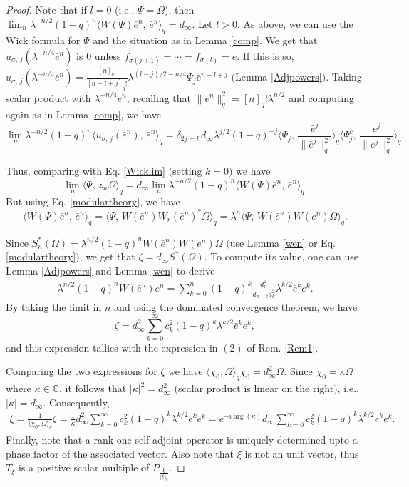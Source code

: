 \documentclass[12pt, a4paper,reqno]{amsart}
\theoremstyle{definition}
\def\C{\mathbb C}
\newcommand{\norm}[1]{\left\Vert#1\right\Vert}
\newcommand{\abs}[1]{\left\vert#1\right\vert}
\begin{document}
\begin{proof}
Note that if $l=0$ (i.e., $\Psi=\Omega$), then $\lim_n\lambda^{-n/2}(1-q)^n\langle W(\Psi) \bar{e}^n,\,\bar{e}^n\rangle_q=d_\infty$. 
Let $l>0$. As above, we can use the Wick formula for $\Psi$ and the situation as in Lemma \ref{comp}. We get that $u_{\sigma,\,j}(\lambda^{-n/4}\bar{e}^n)$ is $0$ unless $f_{\sigma(j+1)}=\cdots=f_{\sigma(l)}=e$. If this is so, $u_{\sigma,\,j}(\lambda^{-n/4}\bar{e}^n)=\frac{[n]_q!}{[n-l+j]_q!}\lambda^{(l-j)/2-n/4}\Psi_j\bar{e}^{n-l+j}$ $($Lemma \ref{Adjpowers}$)$. Taking scalar product with $\lambda^{-n/4}\bar{e}^n$, recalling that $\|\bar{e}^n\|_q^2= [n]_q!\lambda^{n/2}$ and computing again as in Lemma \ref{comp}, we have 
$$\lim_n \lambda^{-n/2}(1-q)^n\langle u_{\sigma,\,j}(\bar{e}^n), \,\bar{e}^n\rangle_q=
\delta_{2j=l}\, d_\infty\lambda^{j/2}(1-q)^{-j}\langle \Psi_j,\,\frac {\bar{e}^{j}}{\|\bar{e}^{j}\|_q^2}\rangle_q\langle \Psi_j^c,\, \frac {e^{j}}{\|{e}^{j}\|_q^2} \rangle_q.$$

Thus, comparing with Eq. \eqref{Wicklim} $($setting $k=0)$ we have 
$$\lim_n \langle \Psi ,\,z_n \Omega\rangle_q=d_\infty \lim_n
\lambda^{-n/2}(1-q)^n\langle W(\Psi) \bar{e}^n,\,\bar{e}^n\rangle_q.$$ 
But using Eq. \eqref{modulartheory}, we have
$$\langle W(\Psi) \bar{e}^n,\,\bar{e}^n\rangle_q=\langle \Psi,\,W(\bar{e}^n) W_r(\bar{e}^n)^*\Omega\rangle_q=\lambda^n\langle \Psi,\,W(\bar{e}^n) W(e^n)\Omega\rangle_q.$$

Since $S_n^*(\Omega)=\lambda^{n/2}(1-q)^n W(\bar{e}^n) W(e^n)\Omega$ $($use Lemma \ref{wen} or Eq. \eqref{modulartheory}$)$, we get that $\zeta=d_\infty S^*(\Omega)$. To compute its value, one can use Lemma \ref{Adjpowers} and Lemma \ref{wen} to derive 
\begin{align*}
\lambda^{n/2}(1-q)^nW(\bar e ^n)e^n=\sum_{k=0}^n (1-q)^k\frac{d_n^2}{d_{n-k}d_k^2}\lambda^{k/2} \bar e^k e^k.
\end{align*}
By taking the limit in $n$ and using the dominated convergence theorem, we have $$\zeta = d_\infty^2 \sum_{k=0}^\infty c_k^2(1-q)^k \lambda^{k/2} {\bar e}^k e^k,$$
and this expression tallies with the expression in $(2)$ of Rem. \ref{Rem1}.	

Comparing the two expressions for $\zeta$ we have $\langle\chi_0,\Omega\rangle_q\chi_0 = d_\infty^2\Omega$. Since $\chi_0 = \kappa\Omega$ where $\kappa\in \C$, it follows that $\abs{\kappa}^2=d_\infty^2$ $($scalar product is linear on the right$)$, i.e., $\abs{\kappa}=d_\infty$. Consequently,
\begin{align*}
\xi = \frac{1}{\langle \chi_0 , \Omega\rangle_q} \zeta =\frac{1}{\bar \kappa}d_\infty^2 \sum_{k=0}^\infty c_k^2(1-q)^k \lambda^{k/2} {\bar e}^k e^k = e^{-i \arg{(\kappa)}} d_\infty \sum_{k=0}^\infty c_k^2(1-q)^k \lambda^{k/2} {\bar e}^k e^k.
\end{align*} 
Finally, note that a rank-one self-adjoint operator is uniquely determined upto a phase factor of the associated vector. Also note that $\xi$ is not an unit vector, thus $T_\xi$ is a positive scalar multiple of $P_{\frac{\xi}{\norm{\xi}_q}}$. 
\end{proof}
\end{document}
